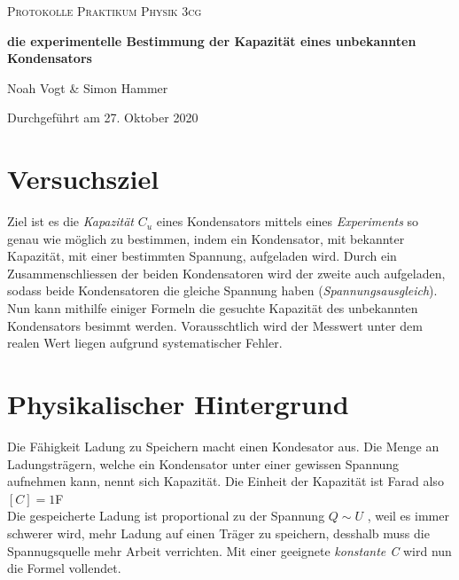 \documentclass[a4paper,12pt]{article}
\begin{document}
\begin{titlepage}

\vspace*{1cm}
	\centering
	
	{\scshape\Large Protokolle Praktikum Physik 3cg \par}
	\vspace{0.5cm}
	{\huge\bfseries die experimentelle Bestimmung der Kapazität eines unbekannten Kondensators\par}
	\vspace{0.5cm}
	{\Large Noah Vogt \& Simon Hammer\par}
	\vspace{17cm}

	{\large Durchgeführt am 27. Oktober 2020\par}
	
\end{titlepage}

\tableofcontents
\pagebreak

\section{Versuchsziel}
Ziel ist es die \textit{Kapazität} $C_u$ eines Kondensators mittels eines \textit{Experiments} so genau wie möglich zu bestimmen, indem ein Kondensator, mit bekannter Kapazität, mit einer bestimmten Spannung, aufgeladen wird. Durch ein Zusammenschliessen der beiden Kondensatoren wird der zweite auch aufgeladen, sodass beide Kondensatoren die gleiche Spannung haben (\textit{Spannungsausgleich}). Nun kann mithilfe einiger Formeln die gesuchte Kapazität des unbekannten Kondensators besimmt werden. Vorausschtlich wird der Messwert unter dem realen Wert liegen aufgrund systematischer Fehler.

\section{Physikalischer Hintergrund}

Die Fähigkeit Ladung zu Speichern macht einen Kondesator aus. Die Menge an Ladungsträgern, welche ein Kondensator unter einer gewissen Spannung aufnehmen kann, nennt sich Kapazität. Die Einheit der Kapazität ist Farad also $[C] = 1 $F \\

Die gespeicherte Ladung ist proportional zu der Spannung $Q \mathtt{\sim} U$ , weil es immer schwerer wird, mehr Ladung auf einen Träger zu speichern, desshalb muss die Spannugsquelle mehr Arbeit verrichten. Mit einer geeignete \textit{konstante C} wird nun die Formel vollendet.
\end{document}
